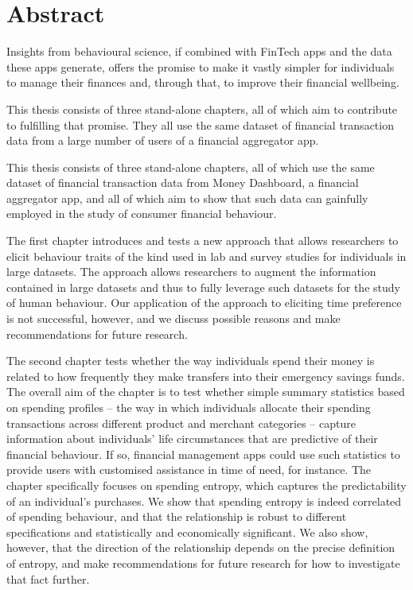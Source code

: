 
\chapter*{Abstract}%
\label{cha:abstract}

Insights from behavioural science, if combined with FinTech apps and the data
these apps generate, offers the promise to make it vastly simpler for
individuals to manage their finances and, through that, to improve their
financial wellbeing. 

{\color{red} This thesis consists of three stand-alone chapters, all of which aim to contribute to fulfilling that promise. They all use the same
dataset of financial transaction data from a large number of users of a
financial aggregator app.}

{\color{blue} This thesis consists of three stand-alone chapters, all of which use the same dataset of financial transaction data from Money Dashboard, a financial aggregator app, and all of which aim to show that such data can gainfully employed in the study of consumer financial behaviour.}

The first chapter introduces and tests a new approach that allows researchers to elicit behaviour traits of the kind used in lab and
survey studies for individuals in large datasets. The approach allows
researchers to augment the information contained in large datasets and thus to
fully leverage such datasets for the study of human behaviour. {\color{blue} Our application of the approach to eliciting time preference is not successful, however, and we discuss possible reasons and make recommendations for future research.}

The second
chapter tests whether the way individuals spend their money is related to how
frequently they make transfers into their emergency savings funds. The overall
aim of the chapter is to test whether simple summary statistics based on
spending profiles -- the way in which individuals allocate their spending
transactions across different product and merchant categories -- capture
information about individuals' life circumstances that are predictive of their
financial behaviour. If so, financial management apps could use such statistics
to provide users with customised assistance in time of need, for instance. {\color{blue} The chapter specifically focuses on spending entropy, which captures the predictability of an individual's purchases. We show that spending entropy is indeed correlated of spending behaviour, and that the relationship is robust to different specifications and statistically and economically significant. We also show, however, that the direction of the relationship depends on the precise definition of entropy, and make recommendations for future research for how to investigate that fact further.}

